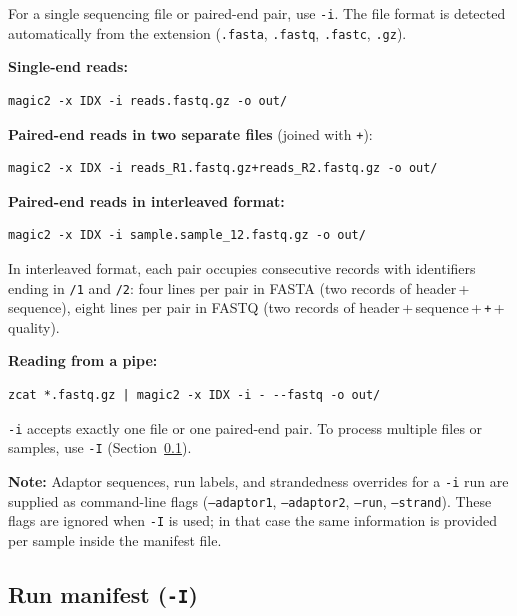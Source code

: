 \documentclass[11pt]{article}
\newcommand{\code}[1]{\texttt{#1}}
\begin{document}
For a single sequencing file or paired-end pair, use \code{-i}.
The file format is detected automatically from the extension
(\code{.fasta}, \code{.fastq}, \code{.fastc}, \code{.gz}).

\textbf{Single-end reads:}
\begin{lstlisting}
magic2 -x IDX -i reads.fastq.gz -o out/
\end{lstlisting}

\textbf{Paired-end reads in two separate files} (joined with \code{+}):
\begin{lstlisting}
magic2 -x IDX -i reads_R1.fastq.gz+reads_R2.fastq.gz -o out/
\end{lstlisting}

\textbf{Paired-end reads in interleaved format:}
\begin{lstlisting}
magic2 -x IDX -i sample.sample_12.fastq.gz -o out/
\end{lstlisting}

In interleaved format, each pair occupies consecutive records with
identifiers ending in \code{/1} and \code{/2}: four lines per pair
in FASTA (two records of header\,+\,sequence), eight lines per pair
in FASTQ (two records of header\,+\,sequence\,+\,\code{+}\,+\,quality).

\textbf{Reading from a pipe:}
\begin{lstlisting}
zcat *.fastq.gz | magic2 -x IDX -i - --fastq -o out/
\end{lstlisting}

\code{-i} accepts exactly one file or one paired-end pair.
To process multiple files or samples, use \code{-I} (Section~\ref{sec:rconfig}).

\begin{notebox}
\textbf{Note:} Adaptor sequences, run labels, and strandedness overrides
for a \code{-i} run are supplied as command-line flags
(\code{--adaptor1}, \code{--adaptor2}, \code{--run}, \code{--strand}).
These flags are ignored when \code{-I} is used; in that case the
same information is provided per sample inside the manifest file.
\end{notebox}


\subsection{Run manifest (\code{-I})}
\label{sec:rconfig}
\end{document}

